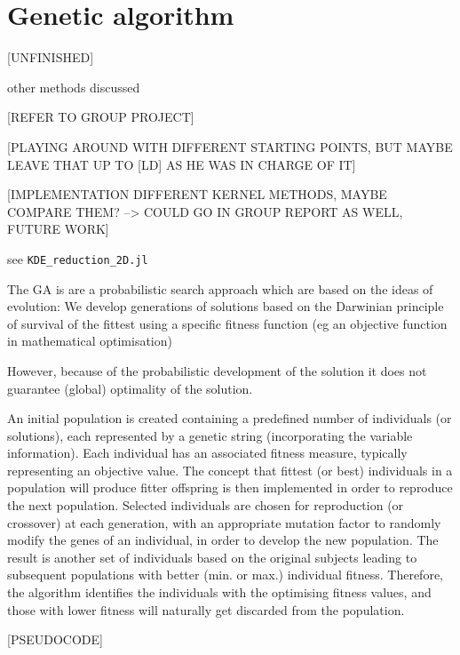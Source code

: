 \documentclass[journal, a4paper]{IEEEtran}
\begin{document}
\section{Genetic algorithm}
[UNFINISHED]

other methods discussed

[REFER TO GROUP PROJECT]

[PLAYING AROUND WITH DIFFERENT STARTING POINTS, BUT MAYBE LEAVE THAT UP TO [LD] AS HE WAS IN CHARGE OF IT]

[IMPLEMENTATION DIFFERENT KERNEL METHODS, MAYBE COMPARE THEM? --> COULD GO IN GROUP REPORT AS WELL, FUTURE WORK]

see \texttt{KDE\_reduction\_2D.jl}


The GA is are a probabilistic search approach which are based on the ideas of evolution: We develop generations of solutions based on the Darwinian principle of survival of the fittest using a specific fitness function (eg an objective function in mathematical optimisation)

However, because of the probabilistic development of the solution it does not guarantee (global) optimality of the solution. 

An initial population is created containing a predefined number of individuals (or solutions), each represented by a genetic string (incorporating the variable information). Each individual has an associated fitness measure, typically representing an objective value. The concept that fittest (or best) individuals in a population will produce fitter offspring is then implemented in order to reproduce the next population. Selected individuals are chosen for reproduction (or crossover) at each generation, with an appropriate mutation factor to randomly modify the genes of an individual, in order to develop the new population. The result is another set of individuals based on the original subjects leading to subsequent populations with better (min. or max.) individual fitness. Therefore, the algorithm identifies the individuals with the optimising fitness values, and those with lower fitness will naturally get discarded from the population.



[PSEUDOCODE]

\end{document}
